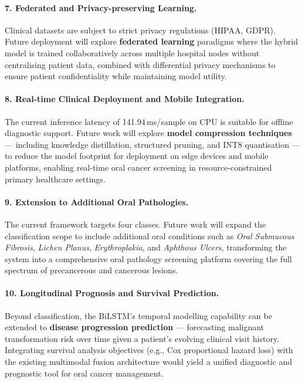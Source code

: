 \paragraph{7. Federated and Privacy-preserving Learning.}
Clinical datasets are subject to strict privacy regulations (HIPAA, GDPR). Future deployment will explore \textbf{federated learning} paradigms where the hybrid model is trained collaboratively across multiple hospital nodes without centralising patient data, combined with differential privacy mechanisms to ensure patient confidentiality while maintaining model utility.

\paragraph{8. Real-time Clinical Deployment and Mobile Integration.}
The current inference latency of 141.94\,ms/sample on CPU is suitable for offline diagnostic support. Future work will explore \textbf{model compression techniques} — including knowledge distillation, structured pruning, and INT8 quantisation — to reduce the model footprint for deployment on edge devices and mobile platforms, enabling real-time oral cancer screening in resource-constrained primary healthcare settings.

\paragraph{9. Extension to Additional Oral Pathologies.}
The current framework targets four classes. Future work will expand the classification scope to include additional oral conditions such as \textit{Oral Submucous Fibrosis}, \textit{Lichen Planus}, \textit{Erythroplakia}, and \textit{Aphthous Ulcers}, transforming the system into a comprehensive oral pathology screening platform covering the full spectrum of precancerous and cancerous lesions.

\paragraph{10. Longitudinal Prognosis and Survival Prediction.}
Beyond classification, the BiLSTM's temporal modelling capability can be extended to \textbf{disease progression prediction} — forecasting malignant transformation risk over time given a patient's evolving clinical visit history. Integrating survival analysis objectives (e.g., Cox proportional hazard loss) with the existing multimodal fusion architecture would yield a unified diagnostic and prognostic tool for oral cancer management.
